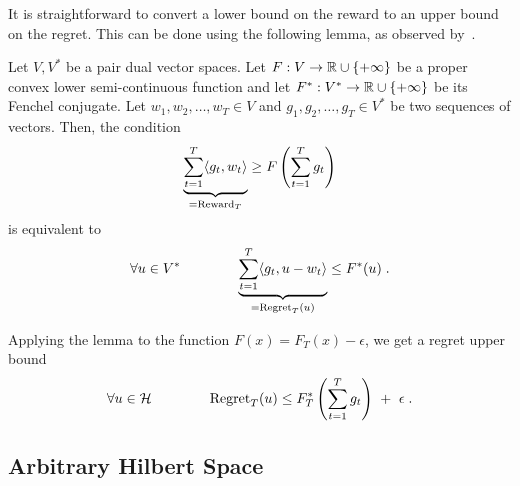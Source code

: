 It is straightforward to convert a lower bound on the reward to an upper bound
on the regret. This can be done using the following lemma, as observed
by~\cite{McMahanO14}.

\begin{lemma}
\label{lemma:reward-regret}
Let $V,V^*$ be a pair dual vector spaces. Let $F:V \to \mathbb{R} \cup \{+\infty\}$ be a
proper convex lower semi-continuous function and let $F^*:V^* \to \mathbb{R} \cup
\{+\infty\}$ be its Fenchel conjugate. Let $w_1, w_2, \dots, w_T \in V$ and
$g_1, g_2, \dots, g_T \in V^*$ be two sequences of vectors.  Then, the condition
$$
\underbrace{\sum_{t=1}^T \langle g_t, w_t \rangle}_{=\operatorname{Reward}_T} \ge F\left( \sum_{t=1}^T g_t \right)
$$
is equivalent to
$$
\forall u \in V^* \qquad \qquad
\underbrace{\sum_{t=1}^T \langle g_t, u - w_t\rangle}_{=\operatorname{Regret}_T(u)} \le F^*(u) \; .
$$
\end{lemma}

Applying the lemma to the function $F(x) = F_T(x) - \epsilon$, we get a regret
upper bound
$$
\forall u \in \mathcal{H} \qquad \qquad
\operatorname{Regret}_T(u) \le F_T^*\left(\sum_{t=1}^T g_t \right) \ + \ \epsilon \; .
$$

\subsection{Arbitrary Hilbert Space}

